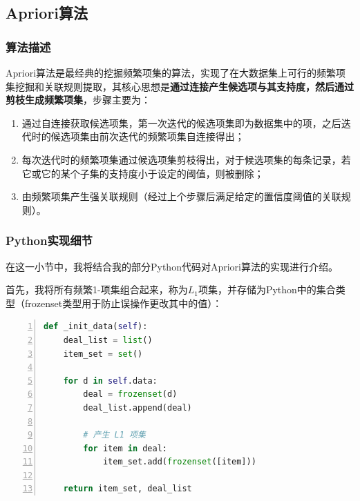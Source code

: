 \documentclass[12pt,a4paper]{article}
\theoremstyle{definition}
\begin{document}
\subsection{Apriori算法}

\subsubsection{算法描述}
\vspace{0.006\linewidth}
Apriori算法是最经典的挖掘频繁项集的算法，实现了在大数据集上可行的频繁项集挖掘和关联规则提取，其核心思想是\textbf{通过连接产生候选项与其支持度，然后通过剪枝生成频繁项集}，步骤主要为：

\begin{enumerate}

\item 通过自连接获取候选项集，第一次迭代的候选项集即为数据集中的项，之后迭代时的候选项集由前次迭代的频繁项集自连接得出；

\item 每次迭代时的频繁项集通过候选项集剪枝得出，对于候选项集的每条记录，若它或它的某个子集的支持度小于设定的阈值，则被删除；

\item 由频繁项集产生强关联规则（经过上个步骤后满足给定的置信度阈值的关联规则）。

\end{enumerate}

\subsubsection{Python实现细节}

在这一小节中，我将结合我的部分Python代码对Apriori算法的实现进行介绍。

\vspace{0.01\linewidth}
首先，我将所有频繁1-项集组合起来，称为$L_1$项集，并存储为Python中的集合类型（frozenset类型用于防止误操作更改其中的值）：

\begin{lstlisting}[language=Python,
	numbers=left,
	keywordstyle=\color{blue!70},
	frame=shadowbox,
	breaklines=True]
def _init_data(self):
    deal_list = list()
    item_set = set()

    for d in self.data:
        deal = frozenset(d)
        deal_list.append(deal)

        # 产生 L1 项集
        for item in deal:
            item_set.add(frozenset([item]))

    return item_set, deal_list
\end{lstlisting}
\end{document}
